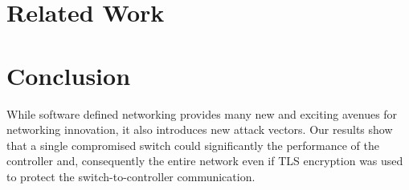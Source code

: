 \documentclass[11pt, letterpaper, twocolumn, twoside]{article}
\begin{document}
\begin{spacing}{1.0}
\section{Related Work}
\label{related}


\section{Conclusion}
While software defined networking provides many new and exciting avenues for networking innovation, it also introduces new attack vectors. Our results show that a single compromised switch could significantly the performance of the controller and, consequently the entire network even if TLS encryption was used to protect the switch-to-controller communication. 





\end{spacing}
\end{document}

